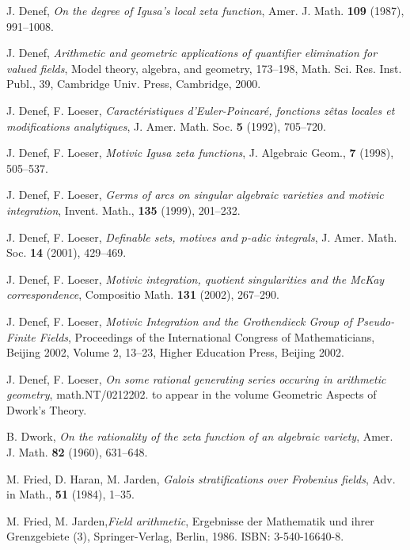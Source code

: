 \documentclass[english,12pt]{amsart}
\theoremstyle{definition}
\theoremstyle{remark}
\theoremstyle{plain}
\numberwithin{equation}{subsection}
\begin{document}
\begin{thebibliography}{SGA}
J. Denef,
\textit{On the degree of Igusa's local zeta function}, 
Amer. J. Math. \textbf{109} (1987), 991--1008.

J. Denef,
\textit{Arithmetic and geometric applications of quantifier elimination for valued fields}, Model
theory, algebra, and geometry, 173--198, Math. Sci. Res. Inst. Publ., 39, Cambridge Univ. Press, Cambridge, 2000.


J. Denef, F. Loeser,
\textit{Caract\'eristiques d'Euler-Poincar\'e,
fonctions z\^etas locales et modifications analytiques},
J. Amer. Math. Soc. \textbf{5} (1992), 705--720.



J. Denef, F. Loeser,
\textit{Motivic Igusa zeta functions},
J. Algebraic Geom.,
\textbf{7} (1998),
505--537.


J. Denef, F. Loeser,
\textit{Germs of arcs on singular algebraic varieties
and motivic integration}, Invent. Math., \textbf{135} (1999), 201--232.

J. Denef, F. Loeser,
\textit{Definable sets, motives and $p$-adic integrals},
J. Amer. Math. Soc. \textbf{14} (2001), 429--469.

J. Denef, F. Loeser,
\textit{Motivic integration, quotient singularities and the McKay correspondence},
Compositio Math. \textbf{131} (2002), 267--290.



J. Denef, F. Loeser,
\textit{Motivic Integration and the Grothendieck Group of Pseudo-Finite Fields},
Proceedings of the International Congress of Mathematicians, Beijing 2002,
Volume 2, 13--23, Higher Education Press, Beijing 2002.


J. Denef, F. Loeser,
\textit{On some
rational generating series occuring in arithmetic geometry},
math.NT/0212202.
to appear in the volume
Geometric Aspects of Dwork's Theory.


B. Dwork,
\textit{On the rationality of the zeta function of an algebraic variety},
Amer. J. Math. \textbf{82} (1960), 631--648.



M. Fried, D. Haran, M. Jarden,
\textit{Galois stratifications over Frobenius fields},
Adv. in  Math., 
\textbf{51}
(1984),
1--35.

 M. Fried, M. Jarden,\textit{Field arithmetic}, Ergebnisse der Mathematik und
ihrer Grenzgebiete (3), Springer-Verlag, Berlin, 1986.  ISBN: 3-540-16640-8.


\end{thebibliography}
\end{document}
